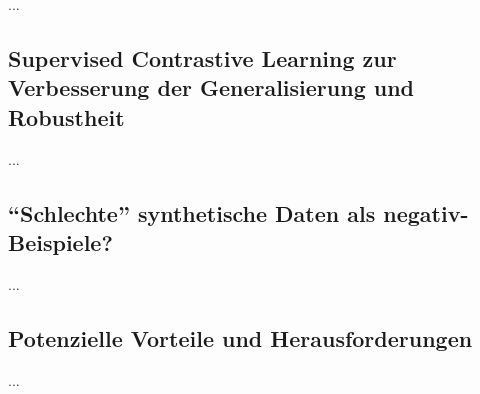 ...

\subsection{Supervised Contrastive Learning zur Verbesserung der Generalisierung und Robustheit}

...

\subsection{“Schlechte” synthetische Daten als negativ-Beispiele?}

...

\subsection{Potenzielle Vorteile und Herausforderungen}

...